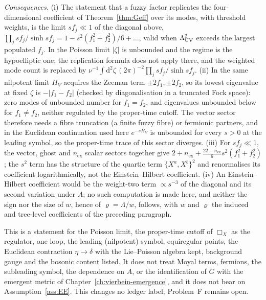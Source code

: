 \emph{Consequences.} (i) The statement that a fuzzy factor replicates the four-dimensional coefficient of Theorem~\ref{thm:Geff} over its modes, with threshold weights, is the limit \(sf_j\ll1\) of the diagonal above, \(\prod_j sf_j/\sinh sf_j=1-s^2(f_1^2+f_2^2)/6+\dots\), valid when \(\Lambda_{\mathrm{UV}}^2\) exceeds the largest populated \(f_j\). In the Poisson limit \(|\zeta|\) is unbounded and the regime is the hypoelliptic one; the replication formula does not apply there, and the weighted mode count is replaced by \(\nu^{-1}\int\mathrm d^2\zeta\,(2\pi)^{-2}\prod_j sf_j/\sinh sf_j\). (ii) In the same nilpotent limit \(H_V\) acquires the Zeeman term \(\pm2f_1,\pm2f_2\), so its lowest eigenvalue at fixed \(\zeta\) is \(-|f_1-f_2|\) (checked by diagonalisation in a truncated Fock space): zero modes of unbounded number for \(f_1=f_2\), and eigenvalues unbounded below for \(f_1\ne f_2\), neither regulated by the proper-time cutoff. The vector sector therefore needs a fibre truncation (a finite fuzzy fibre) or fermionic partners, and in the Euclidean continuation used here \(e^{-sH_V}\) is unbounded for every \(s>0\) at the leading symbol, so the proper-time trace of this sector diverges. (iii) For \(sf_j\ll1\), the vector, ghost and \(n_{\mathrm{ex}}\) scalar sectors together give \(2+n_{\mathrm{ex}}+\tfrac{22-n_{\mathrm{ex}}}{6}s^2(f_1^2+f_2^2)\); the \(s^2\) term has the structure of the quartic term \(\{X^a,X^b\}^2\) and renormalises its coefficient logarithmically, not the Einstein--Hilbert coefficient. (iv) An Einstein--Hilbert coefficient would be the weight-two term \(\propto s^{-3}\) of the diagonal and its second variation under \(A\); no such computation is made here, and neither the sign nor the size of \(w\), hence of \(\varrho=\Lambda/w\), follows, with \(w\) and \(\varrho\) the induced and tree-level coefficients of the preceding paragraph.

This is a statement for the Poisson limit, the proper-time cutoff of \(\Box_X\) as the regulator, one loop, the leading (nilpotent) symbol, equiregular points, the Euclidean contraction \(\eta\to\delta\) with the Lie--Poisson algebra kept, background gauge and the bosonic content listed. It does not treat Moyal terms, fermions, the subleading symbol, the dependence on \(A\), or the identification of \(G\) with the emergent metric of Chapter~\ref{ch:vierbein-emergence}, and it does not bear on Assumption~\ref{ass:EE}. This changes no ledger label; Problem~F remains open.

